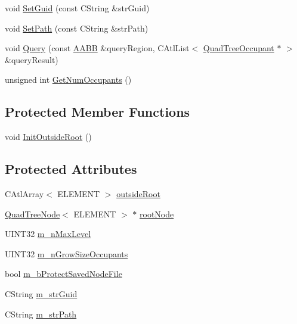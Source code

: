 \begin{DoxyCompactItemize}
\item 
void \hyperlink{class_quad_tree_a5a76ddae5772eabd252a9f9805cd8f17}{Set\+Guid} (const C\+String \&str\+Guid)
\item 
void \hyperlink{class_quad_tree_a31fd59d51714ab417960fa308150b52b}{Set\+Path} (const C\+String \&str\+Path)
\item 
void \hyperlink{class_quad_tree_acd2f09209fc6ef6b6cb57e52f0c8a504}{Query} (const \hyperlink{struct_a_a_b_b}{A\+A\+B\+B} \&query\+Region, C\+Atl\+List$<$ \hyperlink{class_quad_tree_occupant}{Quad\+Tree\+Occupant} $\ast$ $>$ \&query\+Result)
\item 
unsigned int \hyperlink{class_quad_tree_ad5c51585b589176324768c33c61d2584}{Get\+Num\+Occupants} ()
\end{DoxyCompactItemize}
\subsection*{Protected Member Functions}
\begin{DoxyCompactItemize}
\item 
void \hyperlink{class_quad_tree_a7887e1eb1c840231c475ce82b37a9595}{Init\+Outside\+Root} ()
\end{DoxyCompactItemize}
\subsection*{Protected Attributes}
\begin{DoxyCompactItemize}
\item 
C\+Atl\+Array$<$ E\+L\+E\+M\+E\+N\+T $>$ \hyperlink{class_quad_tree_a810de5df1773133707e81a018832a88c}{outside\+Root}
\item 
\hyperlink{class_quad_tree_node}{Quad\+Tree\+Node}$<$ E\+L\+E\+M\+E\+N\+T $>$ $\ast$ \hyperlink{class_quad_tree_a0d86bcbcea5607193be82bbd8621a34d}{root\+Node}
\item 
U\+I\+N\+T32 \hyperlink{class_quad_tree_ae6ef9f08260312e1d9c66e9d6c85a7cc}{m\+\_\+n\+Max\+Level}
\item 
U\+I\+N\+T32 \hyperlink{class_quad_tree_af848e0557a15edeb8062d885edd07f59}{m\+\_\+n\+Grow\+Size\+Occupants}
\item 
bool \hyperlink{class_quad_tree_af2cd15fca091232a9b9903348e08a421}{m\+\_\+b\+Protect\+Saved\+Node\+File}
\item 
C\+String \hyperlink{class_quad_tree_aa2442bd74f5a5e2fb98f7aefa7f6b266}{m\+\_\+str\+Guid}
\item 
C\+String \hyperlink{class_quad_tree_af1472627552c542d278dc1b4b4649643}{m\+\_\+str\+Path}
\end{DoxyCompactItemize}


